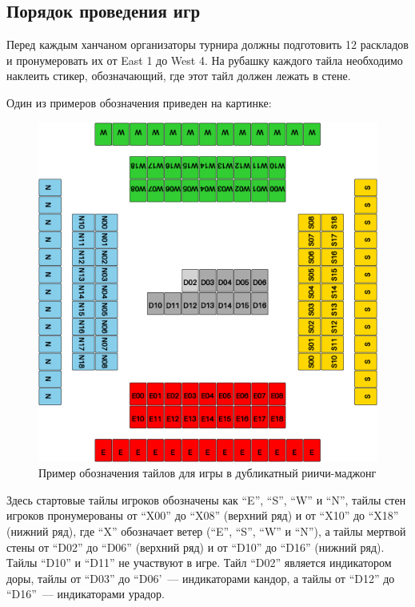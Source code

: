 \begin{additional}
\subsection{Порядок проведения игр}

Перед каждым ханчаном организаторы турнира должны подготовить 12 раскладов и пронумеровать их от East 1 до West 4. На рубашку каждого тайла необходимо наклеить стикер, обозначающий, где этот тайл должен лежать в стене.

Один из примеров обозначения приведен на картинке:

\begin{figure}[H]
	\centering
	\includegraphics[width=12cm]{img/duplicate_marks.png}
	\caption{Пример обозначения тайлов для игры в дубликатный риичи-маджонг}
\end{figure}

Здесь стартовые тайлы игроков обозначены как ``E'', ``S'', ``W'' и ``N'', тайлы стен игроков пронумерованы от ``X00'' до ``X08'' (верхний ряд) и от ``X10'' до ``X18'' (нижний ряд), где ``X'' обозначает ветер (``E'', ``S'', ``W'' и ``N''), а тайлы мертвой стены от ``D02'' до ``D06'' (верхний ряд) и от ``D10'' до ``D16'' (нижний ряд). Тайлы ``D10'' и ``D11'' не участвуют в игре. Тайл ``D02'' является индикатором доры, тайлы от ``D03'' до ``D06'~--- индикаторами кандор, а тайлы от ``D12'' до ``D16''~--- индикаторами урадор.

\vspace{0.3cm}


\end{additional}
